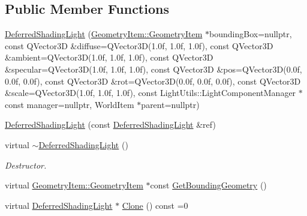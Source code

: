 \subsection*{Public Member Functions}
\begin{DoxyCompactItemize}
\item 
\mbox{\hyperlink{class_geometry_engine_1_1_geometry_world_item_1_1_geometry_light_1_1_deferred_shading_light_afff0b20197ce0582f3bd5ed830769113}{Deferred\+Shading\+Light}} (\mbox{\hyperlink{class_geometry_engine_1_1_geometry_world_item_1_1_geometry_item_1_1_geometry_item}{Geometry\+Item\+::\+Geometry\+Item}} $\ast$bounding\+Box=nullptr, const Q\+Vector3D \&diffuse=Q\+Vector3D(1.\+0f, 1.\+0f, 1.\+0f), const Q\+Vector3\+D \&ambient=\+Q\+Vector3\+D(1.\+0f, 1.\+0f, 1.\+0f), const Q\+Vector3\+D \&specular=\+Q\+Vector3\+D(1.\+0f, 1.\+0f, 1.\+0f), const Q\+Vector3\+D \&pos=\+Q\+Vector3\+D(0.\+0f, 0.\+0f, 0.\+0f), const Q\+Vector3\+D \&rot=\+Q\+Vector3\+D(0.\+0f, 0.\+0f, 0.\+0f), const Q\+Vector3\+D \&scale=\+Q\+Vector3\+D(1.\+0f, 1.\+0f, 1.\+0f), const Light\+Utils\+::\+Light\+Component\+Manager $\ast$const manager=nullptr, World\+Item $\ast$parent=nullptr)
\item 
\mbox{\hyperlink{class_geometry_engine_1_1_geometry_world_item_1_1_geometry_light_1_1_deferred_shading_light_a0fd11e2d72e7cc625d9ff63ab5757651}{Deferred\+Shading\+Light}} (const \mbox{\hyperlink{class_geometry_engine_1_1_geometry_world_item_1_1_geometry_light_1_1_deferred_shading_light}{Deferred\+Shading\+Light}} \&ref)
\item 
\mbox{\label{class_geometry_engine_1_1_geometry_world_item_1_1_geometry_light_1_1_deferred_shading_light_ae192a09794050997ecdd669bbd2888ba}} 
virtual \mbox{\hyperlink{class_geometry_engine_1_1_geometry_world_item_1_1_geometry_light_1_1_deferred_shading_light_ae192a09794050997ecdd669bbd2888ba}{$\sim$\+Deferred\+Shading\+Light}} ()
\begin{DoxyCompactList}\small\item\em Destructor. \end{DoxyCompactList}\item 
virtual \mbox{\hyperlink{class_geometry_engine_1_1_geometry_world_item_1_1_geometry_item_1_1_geometry_item}{Geometry\+Item\+::\+Geometry\+Item}} $\ast$const \mbox{\hyperlink{class_geometry_engine_1_1_geometry_world_item_1_1_geometry_light_1_1_deferred_shading_light_a39a18c54f23b1ebbe87533b5ad02180f}{Get\+Bounding\+Geometry}} ()
\item 
virtual \mbox{\hyperlink{class_geometry_engine_1_1_geometry_world_item_1_1_geometry_light_1_1_deferred_shading_light}{Deferred\+Shading\+Light}} $\ast$ \mbox{\hyperlink{class_geometry_engine_1_1_geometry_world_item_1_1_geometry_light_1_1_deferred_shading_light_a7ef4d7b7a41cbda01a55bcb0475484d3}{Clone}} () const =0
\end{DoxyCompactItemize}
